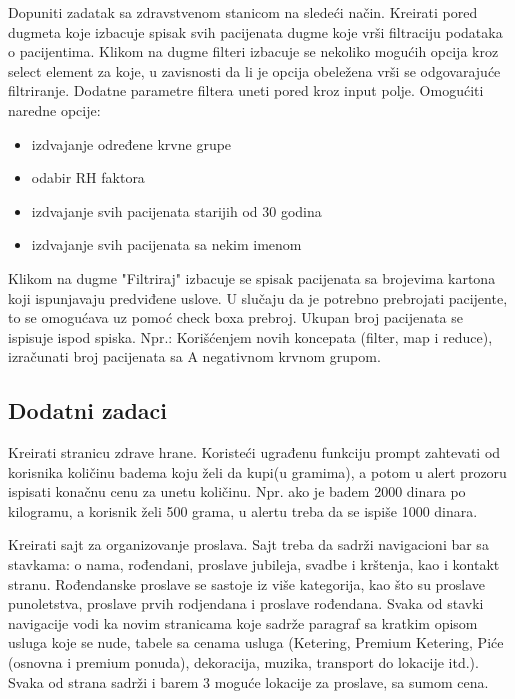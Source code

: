 \begin{primer}
Dopuniti zadatak sa zdravstvenom stanicom na sledeći način. 
Kreirati pored dugmeta koje izbacuje spisak svih pacijenata dugme koje vrši filtraciju podataka o pacijentima.
Klikom na dugme filteri izbacuje se nekoliko mogućih opcija kroz select element za koje, u zavisnosti da li je opcija obeležena vrši se odgovarajuće filtriranje.
Dodatne parametre filtera uneti pored kroz input polje.
Omogućiti naredne opcije:
\begin{itemize}
\item izdvajanje određene krvne grupe
\item odabir RH faktora
\item izdvajanje svih pacijenata starijih od 30 godina
\item izdvajanje svih pacijenata sa nekim imenom 
\end{itemize}
Klikom na dugme "Filtriraj" izbacuje se spisak pacijenata sa brojevima kartona koji ispunjavaju predviđene uslove. 
U slučaju da je potrebno prebrojati pacijente, to se omogućava uz pomoć check boxa prebroj. Ukupan broj pacijenata se ispisuje ispod spiska.
Npr.: Korišćenjem novih koncepata (filter, map i reduce), izračunati broj pacijenata sa A negativnom krvnom grupom.
\end{primer}

\subsection{Dodatni zadaci}
\begin{primer}
Kreirati stranicu zdrave hrane. Koristeći ugrađenu funkciju prompt zahtevati od korisnika količinu badema koju želi da kupi(u gramima), a potom u alert prozoru ispisati konačnu cenu za unetu količinu. Npr. ako je badem 2000 dinara po kilogramu, a korisnik želi 500 grama, u alertu treba da se ispiše 1000 dinara.  
\end{primer}

\begin{primer}
Kreirati sajt za organizovanje proslava. Sajt treba da sadrži navigacioni bar sa stavkama: o nama, rođendani, proslave jubileja, svadbe i krštenja, kao i kontakt stranu. Rođendanske proslave se sastoje iz više kategorija, kao što su proslave punoletstva, proslave prvih rodjendana i proslave rođendana. Svaka od stavki navigacije vodi ka novim stranicama koje sadrže paragraf sa kratkim opisom usluga koje se nude, tabele sa cenama usluga (Ketering, Premium Ketering, Piće (osnovna i premium ponuda), dekoracija, muzika, transport do lokacije itd.). Svaka od strana sadrži i barem 3 moguće lokacije za proslave, sa sumom cena.

\end{primer}


